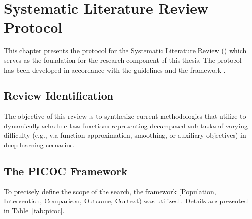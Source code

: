 \chapter{Systematic Literature Review Protocol}

This chapter presents the protocol for the Systematic Literature Review
() which serves as the foundation for the research component of
this thesis. The protocol has been developed in accordance with the
 guidelines \cite{page2021prisma} and the 
framework \cite{kitchenham2007guidelines}.

\section{Review Identification}

The objective of this review is to synthesize current methodologies that
utilize  to dynamically schedule loss functions
representing decomposed sub-tasks of varying difficulty (e.g., via function
approximation, smoothing, or auxiliary objectives) in deep learning scenarios.

\section{The PICOC Framework}

To precisely define the scope of the search, the  framework
(Population, Intervention, Comparison, Outcome, Context) was utilized
\cite{kitchenham2007guidelines}. Details are presented in Table~\ref{tab:picoc}.

